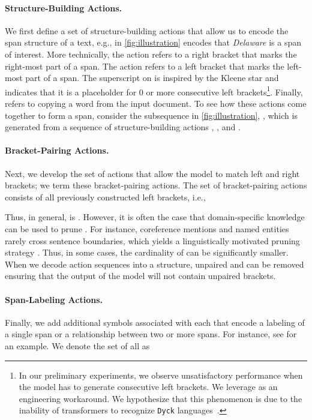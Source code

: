 \documentclass[11pt]{article}
\begin{document}
\paragraph{Structure-Building Actions.} 
We first define a set of structure-building actions  that allow us to encode the span structure of a text, e.g.,  in \cref{fig:illustration} encodes that \textit{Delaware} is a span of interest.
More technically, the action  refers to a right bracket that marks the right-most part of a span.
The action  refers to a left bracket that marks the left-most part of a span.
The superscript  on  is inspired by the Kleene star and indicates that it is a placeholder for 0 or more consecutive left brackets\footnote{In our preliminary experiments, we observe unsatisfactory performance when the model has to generate consecutive left brackets. We leverage  as an engineering workaround. We hypothesize that this phenomenon is due to the inability of transformers to recognize \texttt{Dyck} languages~\citep{hahn-2020-theoretical, hao-etal-2022-formal}.}.
Finally,  refers to copying a word from the input document. 
To see how these actions come together to form a span, consider the subsequence in \cref{fig:illustration}, , which is generated from a sequence of structure-building actions , , and .

\paragraph{Bracket-Pairing Actions.}
Next, we develop the set of actions that allow the model to match left and right brackets; we term these bracket-pairing actions. 
The set of bracket-pairing actions consists of
all previously constructed left brackets, i.e.,

Thus, in general,  is .
However, it is often the case that domain-specific knowledge can be used to prune .
For instance, coreference mentions and named entities rarely cross sentence boundaries, which yields a linguistically motivated pruning strategy \citep{liu-etal-2022-structured}.
Thus, in some cases, the cardinality of  can be significantly smaller.
When we decode action sequences  into a structure, unpaired  and  can be removed ensuring that the output of the model will not contain unpaired brackets.


\paragraph{Span-Labeling Actions.}
Finally, we add additional symbols  associated with each  that encode a labeling of a single span or a relationship between two or more spans.
For instance, see  for an example.
We denote the set of all  as
\end{document}
